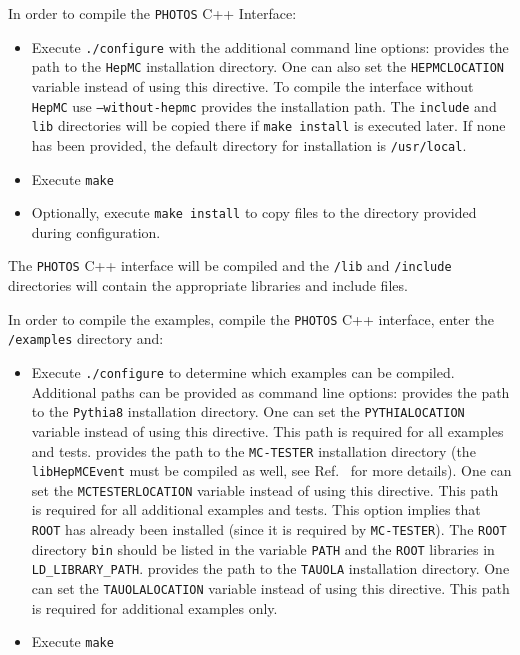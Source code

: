 \documentclass[]{Photos_interface_design}
\begin{document}
In order to compile the {\tt PHOTOS} C++ Interface:
\begin{itemize}
 \item Execute {\tt ./configure} with the additional command line options:
    provides the path to the {\tt HepMC} installation directory. One can also set the {\tt HEPMCLOCATION} variable instead of using this directive. To compile the interface without {\tt HepMC} use {\tt --without-hepmc}
    provides the installation path. The {\tt include} and {\tt lib} directories will be copied there if {\tt make install} is executed later. If none has been provided, the default directory for installation is {\tt /usr/local}.
 \item Execute {\tt make}
 \item Optionally, execute {\tt make install} to copy files to the directory provided during configuration.
\end{itemize}

The {\tt PHOTOS} C++ interface will be compiled and the {\tt /lib} and {\tt /include} directories will contain the appropriate libraries and include files.

In order to compile the examples, compile the {\tt PHOTOS} C++ interface, enter the {\tt /examples} directory and:
\begin{itemize}
  \item Execute {\tt ./configure} to determine which examples can be compiled.
        Additional paths can be provided as command line options:
    provides the path to the {\tt Pythia8} installation
            directory. One can set the {\tt PYTHIALOCATION} variable instead of using this directive.
            This path is required for all examples and tests.
    provides the path to the {\tt MC-TESTER} installation
            directory (the {\tt libHepMCEvent} must be compiled as well, see Ref.~\cite{Davidson:2008ma}
			for more details). One can set the {\tt MCTESTERLOCATION} variable instead of using this
			directive. This path is required for all additional examples and tests.  This option
			implies that {\tt ROOT} has already been installed (since it is required by {\tt MC-TESTER}).
			The {\tt ROOT} directory {\tt bin} should be listed in the variable {\tt PATH} and the {\tt ROOT}
			libraries in {\tt LD\_LIBRARY\_PATH}.
    provides the path to the {\tt TAUOLA} installation directory.
            One can set the {\tt TAUOLALOCATION} variable instead of using this directive.
			This path is required for additional examples only.
  \item Execute {\tt make}
\end{itemize}
\end{document}
